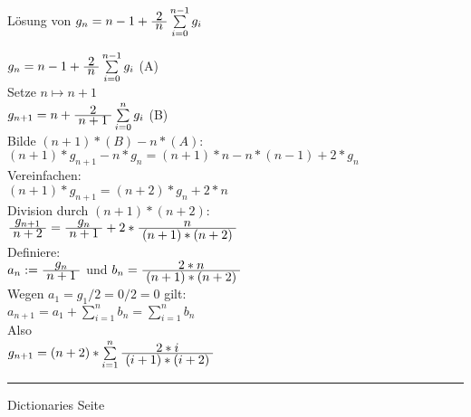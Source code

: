 
\begin{slide}{}
\normalsize

\begin{center}
L\"osung von $g_n = n - 1 + \frac{\displaystyle\;2\;}{\displaystyle\;n\;} \sum\limits_{i=0}^{n-1} g_i$
\end{center}
\vspace*{0.5cm}

\footnotesize
\hspace*{1.3cm} $g_n = n - 1 + \frac{\displaystyle\;2\;}{\displaystyle\;n\;} \sum\limits_{i=0}^{n-1} g_i$
    \hspace*{\fill} (A) \\[0.3cm]
Setze $n \mapsto n + 1$ \\[0.3cm]
\hspace*{1.3cm} $g_{n+1} = n + \frac{\displaystyle\;2\;}{\displaystyle\;n+1\;} \sum\limits_{i=0}^{n} g_i$
    \hspace*{\fill} (B) \\[0.3cm]
Bilde $(n+1)*(B) - n * (A)$: \\[0.5cm]
\hspace*{1.3cm} $(n+1) * g_{n+1} - n * g_n = (n+1)*n - n * (n-1) + 2 * g_n$ \\[0.5cm]
Vereinfachen: \\[0.3cm]
\hspace*{1.3cm} $(n+1) * g_{n+1} = (n+2)*g_n + 2*n$ \\[0.3cm]
Division durch $(n+1)*(n+2)$:\\[0.5cm]
\hspace*{1.3cm} $\frac{\displaystyle\;g_{n+1}\;}{\displaystyle\;n+2\;} = \frac{\displaystyle\;g_n\;}{\displaystyle\;n+1\;} + 2*\frac{\displaystyle\;n\;}{\displaystyle\;(n+1)*(n+2)\;}$ \\[0.3cm]
Definiere: \\[0.3cm]
\hspace*{1.3cm} $a_n := \frac{\displaystyle\;g_n\;}{\displaystyle\;n+1\;}$ \quad und \quad $b_n = \frac{\displaystyle\;2*n\;}{\displaystyle\;(n+1)*(n+2)\;}$ \\[0.5cm]
Wegen $a_1 = g_1/2 = 0/2 = 0$ gilt: \\[0.3cm]
\hspace*{1.3cm} $a_{n+1} = a_1 + \sum\limits_{i=1}^n b_n = \sum\limits_{i=1}^n b_n$ \\[0.3cm]
Also \\[0.3cm]
  \hspace*{1.3cm} $g_{n+1} = (n+2) * \sum\limits_{i=1}^n \frac{\displaystyle\;2*i\;}{\displaystyle\;(i+1)*(i+2)\;}$

\vspace*{\fill}
\tiny \addtocounter{mypage}{1}
\rule{17cm}{1mm}
Dictionaries  \hspace*{\fill} Seite 
\end{slide}

